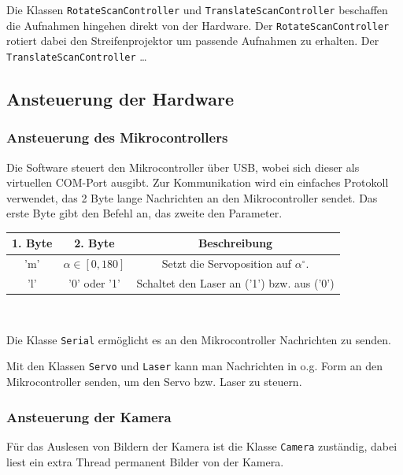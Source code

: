 \documentclass[ngerman,a4paper,parskip=half]{scrartcl}
\begin{document}
Die Klassen \texttt{RotateScanController} und \texttt{TranslateScanController} beschaffen die Aufnahmen hingehen direkt von der Hardware. Der \texttt{RotateScanController} rotiert dabei den Streifenprojektor um passende Aufnahmen zu erhalten. Der \texttt{TranslateScanController} {\color{red} \dots}

\subsection{Ansteuerung der Hardware}

\subsubsection{Ansteuerung des Mikrocontrollers}

Die Software steuert den Mikrocontroller über USB, wobei sich dieser als virtuellen COM-Port ausgibt. Zur Kommunikation wird ein einfaches Protokoll verwendet, das 2 Byte lange Nachrichten an den Mikrocontroller sendet. Das erste Byte gibt den Befehl an, das zweite den Parameter.\\

\begin{tabular}{|c|c|c|}
\hline
1. Byte & 2. Byte & Beschreibung \\
\hline
'm'\footnotemark & $\alpha \in [0,180]$ & Setzt die Servoposition auf $\alpha ^\circ$.\\
\hline
'l' & '0' oder '1' & Schaltet den Laser an ('1') bzw. aus ('0')\\
\hline
\end{tabular}\\


Die Klasse \texttt{Serial} ermöglicht es an den Mikrocontroller Nachrichten zu senden.

Mit den Klassen \texttt{Servo} und \texttt{Laser} kann man Nachrichten in o.g. Form an den Mikrocontroller senden, um den Servo bzw. Laser zu steuern.

\subsubsection{Ansteuerung der Kamera}

Für das Auslesen von Bildern der Kamera ist die Klasse \texttt{Camera} zuständig, dabei liest ein extra Thread permanent Bilder von der Kamera.
\end{document}
